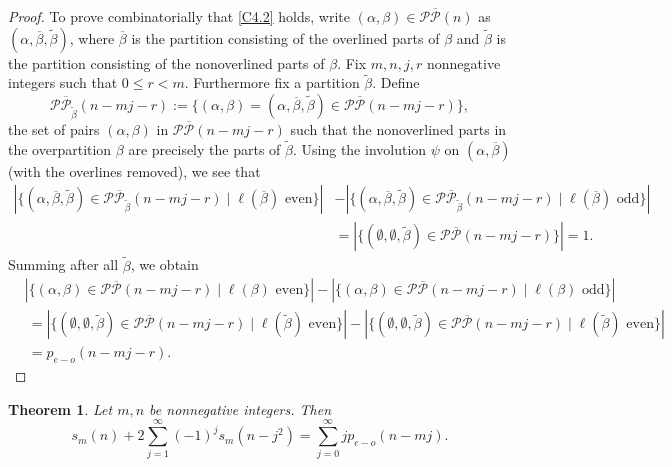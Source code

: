 \documentclass{amsart}
\newtheorem{theorem}{Theorem}[section]
\theoremstyle{definition}
\begin{document}
\begin{proof}
To prove combinatorially that \eqref{C4.2} holds, write $(\alpha, \beta)\in \mathcal P \overline{\mathcal P}(n)$ as $(\alpha, \overline\beta, \widetilde \beta)$, where $\overline \beta$ is the  partition consisting of the overlined parts of $\beta$ and $\widetilde \beta$ is the  partition consisting of the nonoverlined parts of $\beta$. 
Fix $m, n, j,r$ nonnegative integers  such that $0\leq r<m$. 
Furthermore fix a partition $\widetilde \beta$. Define $$\mathcal P \overline{\mathcal P}_{\widetilde \beta}(n-mj-r):=\{(\alpha, \beta)=(\alpha, \overline \beta,\widetilde \beta) \in \mathcal P \overline{\mathcal P}(n-mj-r)\},$$ the set of pairs $(\alpha, \beta)$ in $\mathcal P \overline{\mathcal P}(n-mj-r)$ such that the nonoverlined parts in the overpartition $\beta$ are precisely the parts of $\widetilde \beta$. Using the involution $\psi$ on $(\alpha, \overline \beta)$ (with the overlines removed), we see that \begin{align*}|\{(\alpha, \overline \beta,\widetilde \beta) \in \mathcal P \overline{\mathcal P}_{\widetilde \beta}(n-mj-r)\mid \ell(\overline \beta) \text{ even}\}|& -|\{(\alpha, \overline \beta,\widetilde \beta) \in \mathcal P \overline{\mathcal P}_{\widetilde \beta}(n-mj-r)\mid \ell(\overline \beta) \text{ odd}\}|\\ & = |\{(\emptyset, \emptyset,\widetilde \beta) \in \mathcal P \overline{\mathcal P}(n-mj-r)\}|=1.\end{align*} Summing after all $\widetilde \beta$, we obtain
\begin{align*}&  |\{(\alpha, \beta)\in  \mathcal P \overline{\mathcal P}(n-mj-r) \mid \ell(\beta) \text{ even}\}|- |\{(\alpha, \beta)\in  \mathcal P \overline{\mathcal P}(n-mj-r) \mid \ell(\beta) \text{ odd}\}|\\ &  \  =|\{(\emptyset, \emptyset,\widetilde \beta) \in \mathcal P \overline{\mathcal P}(n-mj-r)\mid\ell(\widetilde \beta) \text{ even}\}|- |\{(\emptyset, \emptyset,\widetilde \beta) \in \mathcal P \overline{\mathcal P}(n-mj-r)\mid\ell(\widetilde \beta) \text{ even}\}|\\ & \  =p_{e-o}(n-mj-r).\end{align*}
\end{proof}

\begin{theorem}{\cite[Corollary 4.4 (i)]{M23}} \label{Cor4.4} Let $m,n$ be nonnegative integers. Then \begin{equation} \label{C4.4} s_{m}(n)+2\sum_{j=1}^\infty (-1)^j s_{m}(n-j^2)= \sum_{j=0}^\infty jp_{e-o}(n-mj).\end{equation}
\end{theorem}
\end{document}
